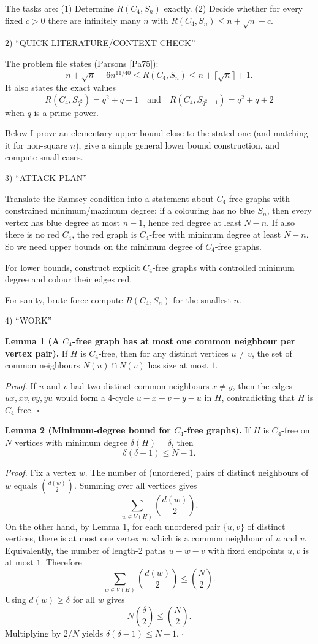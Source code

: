 The tasks are:
(1) Determine $R(C_4,S_n)$ exactly.
(2) Decide whether for every fixed $c>0$ there are infinitely many $n$ with $R(C_4,S_n)\le n+\sqrt n - c$.

2) “QUICK LITERATURE/CONTEXT CHECK”

The problem file states (Parsons [Pa75]):
\[
n+\sqrt{n}-6n^{11/40}\leq R(C_4,S_n)\leq n+\lceil\sqrt{n}\rceil+1.
\]
It also states the exact values
\[
R(C_4,S_{q^2})=q^2+q+1\quad\text{and}\quad R(C_4,S_{q^2+1})=q^2+q+2
\]
when $q$ is a prime power.

Below I prove an elementary upper bound close to the stated one (and matching it for non-square $n$), give a simple general lower bound construction, and compute small cases.

3) “ATTACK PLAN”

Translate the Ramsey condition into a statement about $C_4$-free graphs with constrained minimum/maximum degree: if a colouring has no blue $S_n$, then every vertex has blue degree at most $n-1$, hence red degree at least $N-n$. If also there is no red $C_4$, the red graph is $C_4$-free with minimum degree at least $N-n$. So we need upper bounds on the minimum degree of $C_4$-free graphs.

For lower bounds, construct explicit $C_4$-free graphs with controlled minimum degree and colour their edges red.

For sanity, brute-force compute $R(C_4,S_n)$ for the smallest $n$.

4) “WORK”

\textbf{Lemma 1 (A $C_4$-free graph has at most one common neighbour per vertex pair).}
If $H$ is $C_4$-free, then for any distinct vertices $u\neq v$, the set of common neighbours $N(u)\cap N(v)$ has size at most $1$.

\emph{Proof.}
If $u$ and $v$ had two distinct common neighbours $x\neq y$, then the edges $ux,xv,vy,yu$ would form a 4-cycle $u-x-v-y-u$ in $H$, contradicting that $H$ is $C_4$-free. $\square$

\textbf{Lemma 2 (Minimum-degree bound for $C_4$-free graphs).}
If $H$ is $C_4$-free on $N$ vertices with minimum degree $\delta(H)=\delta$, then
\[
\delta(\delta-1)\le N-1.
\]

\emph{Proof.}
Fix a vertex $w$. The number of (unordered) pairs of distinct neighbours of $w$ equals $\binom{d(w)}{2}$. Summing over all vertices gives
\[
\sum_{w\in V(H)} \binom{d(w)}{2}.
\]
On the other hand, by Lemma 1, for each unordered pair $\{u,v\}$ of distinct vertices, there is at most one vertex $w$ which is a common neighbour of $u$ and $v$. Equivalently, the number of length-2 paths $u-w-v$ with fixed endpoints $u,v$ is at most $1$. Therefore
\[
\sum_{w\in V(H)} \binom{d(w)}{2} \le \binom{N}{2}.
\]
Using $d(w)\ge \delta$ for all $w$ gives
\[
N\binom{\delta}{2} \le \binom{N}{2}.
\]
Multiplying by $2/N$ yields $\delta(\delta-1)\le N-1$. $\square$


